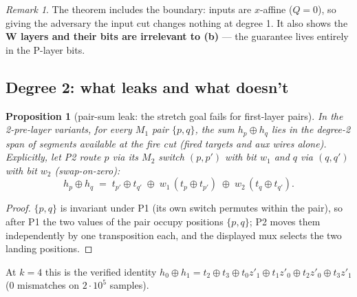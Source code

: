 \documentclass[11pt]{article}
\newtheorem{proposition}[theorem]{Proposition}
\theoremstyle{remark}
\newtheorem*{remark}{Remark}
\begin{document}
\begin{remark}
The theorem includes the boundary: inputs are $x$-affine ($Q=0$), so giving the adversary the
input cut changes nothing at degree 1. It also shows the \textbf{W layers and their bits are
irrelevant to (b)} --- the guarantee lives entirely in the P-layer bits.
\end{remark}

\subsection{Degree 2: what leaks and what doesn't}\label{sec:deg2}

\begin{proposition}[pair-sum leak: the stretch goal fails for first-layer pairs]\label{prop:pairleak}
In the 2-pre-layer variants, for every $M_1$ pair $\{p,q\}$, the sum $h_p\oplus h_q$ lies in the
degree-2 span of segments available at the fire cut (fired targets and aux wires alone).
Explicitly, let P2 route $p$ via its $M_2$ switch $(p,p')$ with bit $w_1$ and $q$ via $(q,q')$
with bit $w_2$ (swap-on-zero):
\[
h_p\oplus h_q \;=\; t_{p'}\oplus t_{q'}\;\oplus\;w_1\,(t_p\oplus t_{p'})\;\oplus\;w_2\,(t_q\oplus t_{q'}).
\]
\end{proposition}
\begin{proof}
$\{p,q\}$ is invariant under P1 (its own switch permutes within the pair), so after P1 the two
values of the pair occupy positions $\{p,q\}$; P2 moves them independently by one transposition
each, and the displayed mux selects the two landing positions.
\end{proof}
At $k=4$ this is the verified identity
$h_0\oplus h_1=t_2\oplus t_3\oplus t_0z'_1\oplus t_1z'_0\oplus t_2z'_0\oplus t_3z'_1$
($0$ mismatches on $2\cdot10^5$ samples).
\end{document}
